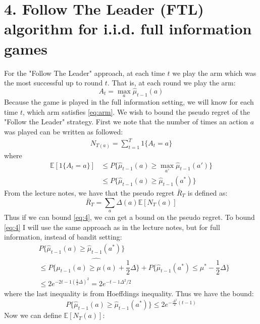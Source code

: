 \documentclass{article}
\begin{document}
\section{4. Follow The Leader (FTL) algorithm for i.i.d. full information games}
For the "Follow The Leader" approach, at each time $t$ we play the arm which was the most successful up to round $t$. That is, at each round we play the arm:
\begin{equation}
\label{eq:arm}
A_t = \max_{a} \hat{\mu}_{t-1}(a)
\end{equation}
Because the game is played in the full information setting, we will know for each time $t$, which arm satisfies \eqref{eq:arm}. We wish to bound the pseudo regret of the "Follow the Leader" strategy. First we note that the number of times an action $a$ was played can be written as followed:
\begin{align}
N_{T(a)} = \sum_{t=1}^T 1\lbrace A_t = a \rbrace
\end{align}
where
\begin{align}
\mathbb{E}[1\lbrace A_t =a \rbrace ] &\leq P \lbrace \hat{\mu}_{t-1}(a) \geq \max_{a'} \hat{\mu}_{t-1}(a') \rbrace \\
&\leq P \lbrace \hat{\mu}_{t-1}(a) \geq \hat{\mu}_{t-1}(a^*) \rbrace
\label{eq:4}
\end{align}
From the lecture notes, we have that the pseudo regret $\bar{R}_T$ is defined as:
\begin{equation}
\bar{R}_T = \sum\limits_{a} \Delta(a) \mathbb{E}[N_T(a)]
\label{eq:regret}
\end{equation}
Thus if we can bound \eqref{eq:4}, we can get a bound on the pseudo regret. To bound \eqref{eq:4} I will use the same approach as in the lecture notes, but for full information, instead of bandit setting:
\begin{align}
&P \lbrace \hat{\mu}_{t-1}(a) \geq \hat{\mu}_{t-1}(a^*) \rbrace \\
&\leq P \lbrace \hat{\mu_{t-1}(a) \geq \mu(a) + \dfrac{1}{2} \Delta} \rbrace + 
P \lbrace \hat{\mu}_{t-1}(a^*) \leq \mu^* - \dfrac{1}{2} \Delta \rbrace \\
&\leq 2 e^{-2t-1(\frac{1}{2}\Delta)^2} = 2e^{-t-1 \Delta^2 / 2}
\end{align}
where the last inequality is from Hoeffdings inequality.
Thus we have the bound:
\begin{equation}
P \lbrace \hat{\mu}_{t-1}(a) \geq \hat{\mu}_{t-1}(a^*) \rbrace \leq 2 e^{-\frac{\Delta^2}{2}(t-1)}
\end{equation}
Now we can define $\mathbb{E}[N_T(a)]$:
\end{document}
